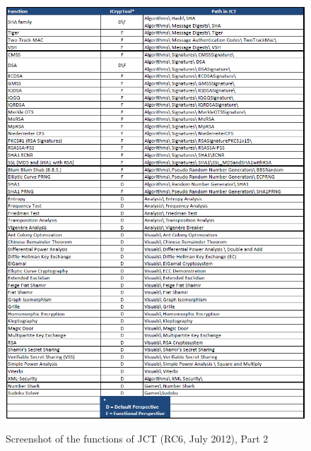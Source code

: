 \clearpage
\begin{figure}[hb]
\begin{center}
\vspace{-30pt}
\includegraphics[scale=0.8, angle=0] {figures/JCT-functions-en-2}
\hypertarget{template-overview-CT2}{}
\caption{Screenshot of the functions of JCT (RC6, July 2012), Part 2} 
\label{functions-overview-2-JCT}
\end{center}
\end{figure}
\clearpage

